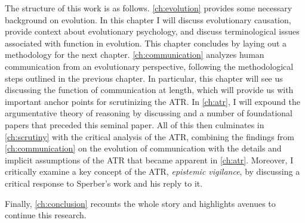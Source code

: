 The structure of this work is as follows.
\cref{ch:evolution} provides some necessary background on evolution. In this chapter I will discuss evolutionary causation, provide context about evolutionary psychology, and discuss terminological issues associated with function in evolution. This chapter concludes by laying out a methodology for the next chapter.
\cref{ch:communication} analyzes human communication from an evolutionary perspective, following the methodological steps outlined in the previous chapter. In particular, this chapter will see us discussing the function of communication at length, which will provide us with important anchor points for scrutinizing the ATR.
In \cref{ch:atr}, I will expound the argumentative theory of reasoning by discussing \citet{MS11} and a number of foundational papers that preceded this seminal paper.
All of this then culminates in \cref{ch:scrutiny} with the critical analysis of the ATR, combining the findings from \cref{ch:communication} on the evolution of communication with the details and implicit assumptions of the ATR that became apparent in \cref{ch:atr}. Moreover, I critically examine a key concept of the ATR, \emph{epistemic vigilance}, by discussing a critical response to Sperber's work and his reply to it.

Finally, \cref{ch:conclusion} recounts the whole story and highlights avenues to continue this research.
